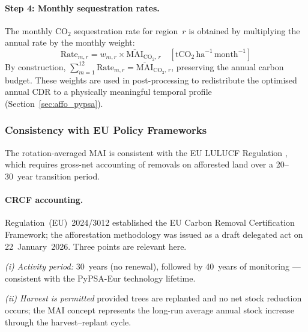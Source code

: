 \documentclass[12pt, a4paper]{article}
\begin{document}
\paragraph{Step 4: Monthly sequestration rates.}
The monthly CO$_2$ sequestration rate for region~$r$ is obtained by
multiplying the annual rate by the monthly weight:
\begin{equation}
    \text{Rate}_{m,r}
    = w_{m,r} \times \overline{\text{MAI}}_{\text{CO}_2,\, r}
    \quad [\text{tCO}_2\,\text{ha}^{-1}\,\text{month}^{-1}]
    \label{eq:monthly_rate}
\end{equation}
By construction,
$\sum_{m=1}^{12} \text{Rate}_{m,r} = \overline{\text{MAI}}_{\text{CO}_2,\, r}$,
preserving the annual carbon budget. These weights are used in post-processing
to redistribute the optimised annual CDR to a physically meaningful
temporal profile (Section~\ref{sec:affo_pypsa}).

\subsubsection{Consistency with EU Policy Frameworks}
\label{sec:affo_policy}

The rotation-averaged MAI is consistent with the EU LULUCF Regulation
\citep{EU2018841, EU2023839}, which requires gross-net accounting of removals
on afforested land over a 20--30~year transition period.

\paragraph{CRCF accounting.}
Regulation~(EU)~2024/3012 \citep{EU20243012} established the EU Carbon
Removal Certification Framework; the afforestation methodology was issued as
a draft delegated act on 22~January~2026. Three points are relevant here.

\textit{(i) Activity period:} 30~years (no renewal), followed by 40~years of
monitoring --- consistent with the PyPSA-Eur technology lifetime.

\textit{(ii) Harvest is permitted} provided trees are replanted and no net
stock reduction occurs; the MAI concept represents the long-run average annual
stock increase through the harvest--replant cycle.
\end{document}
